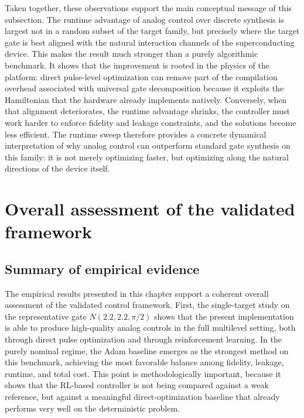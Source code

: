 Taken together, these observations support the main conceptual message of this subsection. The runtime advantage of analog control over discrete synthesis is largest not in a random subset of the target family, but precisely where the target gate is best aligned with the natural interaction channels of the superconducting device. This makes the result much stronger than a purely algorithmic benchmark. It shows that the improvement is rooted in the physics of the platform: direct pulse-level optimization can remove part of the compilation overhead associated with universal gate decomposition because it exploits the Hamiltonian that the hardware already implements natively. Conversely, when that alignment deteriorates, the runtime advantage shrinks, the controller must work harder to enforce fidelity and leakage constraints, and the solutions become less efficient. The runtime sweep therefore provides a concrete dynamical interpretation of why analog control can outperform standard gate synthesis on this family: it is not merely optimizing faster, but optimizing along the natural directions of the device itself.

\section{Overall assessment of the validated framework}
\label{sec:overall_assessment}

\subsection{Summary of empirical evidence}
\label{subsec:summary_empirical_evidence}

The empirical results presented in this chapter support a coherent overall assessment of the validated control framework. First, the single-target study on the representative gate \(N(2.2,2.2,\pi/2)\) shows that the present implementation is able to produce high-quality analog controls in the full multilevel setting, both through direct pulse optimization and through reinforcement learning. In the purely nominal regime, the Adam baseline emerges as the strongest method on this benchmark, achieving the most favorable balance among fidelity, leakage, runtime, and total cost. This point is methodologically important, because it shows that the RL-based controller is not being compared against a weak reference, but against a meaningful direct-optimization baseline that already performs very well on the deterministic problem.

